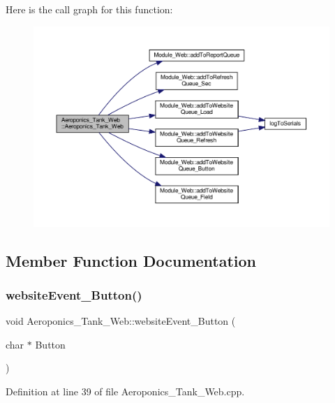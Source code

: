 Here is the call graph for this function\+:
\nopagebreak
\begin{figure}[H]
\begin{center}
\leavevmode
\includegraphics[width=350pt]{class_aeroponics___tank___web_ad54536abd76cc156d1d59b55750074de_cgraph}
\end{center}
\end{figure}


\subsection{Member Function Documentation}
\mbox{\label{class_aeroponics___tank___web_a2dea9353cb1709b51f496d8d0caa928e}} 
\subsubsection{\texorpdfstring{website\+Event\+\_\+\+Button()}{websiteEvent\_Button()}}
{\footnotesize\ttfamily void Aeroponics\+\_\+\+Tank\+\_\+\+Web\+::website\+Event\+\_\+\+Button (\begin{DoxyParamCaption}\item[{char $\ast$}]{Button }\end{DoxyParamCaption})}



Definition at line 39 of file Aeroponics\+\_\+\+Tank\+\_\+\+Web.\+cpp.

